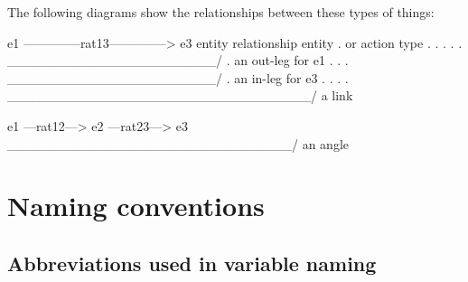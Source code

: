 The following diagrams show the relationships between these types of things\+: \begin{DoxyVerb}  e1 –––––––––rat13–––––––––> e3
entity     relationship     entity
  .       or action type       .
  .             .              .
  .       \______________________/
  .           an out-leg for e1
  .             .              .
\______________________/       .
    an in-leg for e3           .
  .             .              .
\________________________________/
              a link


  e1 ––rat12––> e2 ––rat23––> e3
 \______________________________/
             an angle
\end{DoxyVerb}


\section*{Naming conventions }

\subsection*{Abbreviations used in variable naming }


